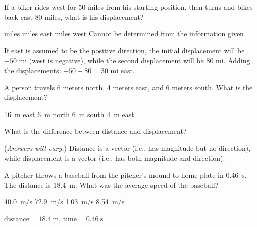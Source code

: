 \documentclass[]{exam}
\begin{document}
\begin{questions}
\begin{questions}


\question
If a biker rides west for 50 miles from his starting position, then turns and bikes back east 80 miles, what is his displacement?

\begin{choices}
 miles
 miles east
 miles west
\choice Cannot be determined from the information given
\end{choices}

\begin{solution}
If east is assumed to be the positive direction, the initial displacement will be $-50$ mi (west is negative), while the second displacement will be 80 mi. Adding the displacements: $-50 + 80 = 30$ mi east.
\end{solution}

\question
A person travels 6 meters north, 4 meters east, and 6 meters south. What is the displacement?

\begin{choices}
\choice \SI{16}{\meter} east
\choice \SI{6}{\meter} north
\choice \SI{6}{\meter} south
\CorrectChoice \SI{4}{\meter} east
\end{choices}

\question %
What is the difference between distance and displacement?

\begin{solution}
(\textit{Answers will vary.}) Distance is a vector (i.e., has magnitude but no direction), while displacement is a vector (i.e., has both magnitude and direction).
\end{solution}

\clearpage


\question
A pitcher throws a baseball from the pitcher's mound to home plate in \SI{0.46}{s}. The distance is \SI{18.4}{m}. What was the average speed of the baseball?

\begin{choices}
\correctchoice \SI{40.0}{m/s}
\choice \SI{72.9}{m/s}
\choice \SI{1.03}{m/s}
\choice \SI{8.54}{m/s}
\end{choices}

\begin{solution}
    $\text{distance} = \SI{18.4}{\meter}$, $\text{time}=\SI{0.46}{\second}$


\end{solution}
\end{questions}
\end{questions}
\end{document}
